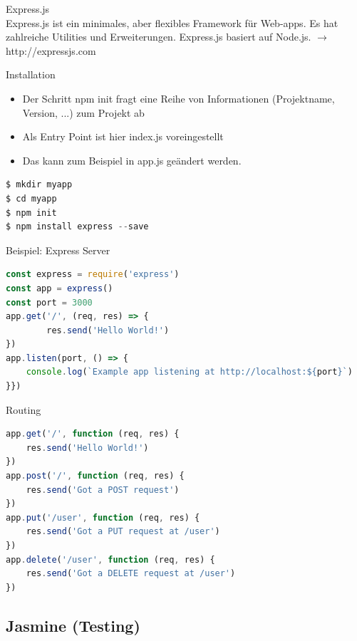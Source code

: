 \begin{concept}{Express.js}\\
    Express.js ist ein minimales, aber flexibles Framework für Web-apps. Es hat zahlreiche Utilities und Erweiterungen. 
    Express.js basiert auf Node.js.
    $\rightarrow$ http://expressjs.com
\end{concept}


\begin{KR}{Installation}
\begin{itemize}
  \item Der Schritt npm init fragt eine Reihe von Informationen (Projektname, Version, ...) zum Projekt ab
  \item Als Entry Point ist hier index.js voreingestellt
  \item Das kann zum Beispiel in app.js geändert werden.
\end{itemize}
\begin{lstlisting}[language=JavaScript, style=basesmol]
$ mkdir myapp
$ cd myapp
$ npm init
$ npm install express --save
\end{lstlisting}
\end{KR}

\begin{code}{Beispiel: Express Server}
\begin{lstlisting}[language=JavaScript, style=basesmol]
const express = require('express')
const app = express()
const port = 3000
app.get('/', (req, res) => {
        res.send('Hello World!')
})
app.listen(port, () => {
    console.log(`Example app listening at http://localhost:${port}`)
}})
\end{lstlisting}
\end{code}

\begin{KR}{Routing}
\begin{lstlisting}[language=JavaScript, style=basesmol]
app.get('/', function (req, res) {
    res.send('Hello World!')
})
app.post('/', function (req, res) {
    res.send('Got a POST request')
})
app.put('/user', function (req, res) {
    res.send('Got a PUT request at /user')
})
app.delete('/user', function (req, res) {
    res.send('Got a DELETE request at /user')
})
\end{lstlisting}
\end{KR}






\subsection{Jasmine (Testing)}

